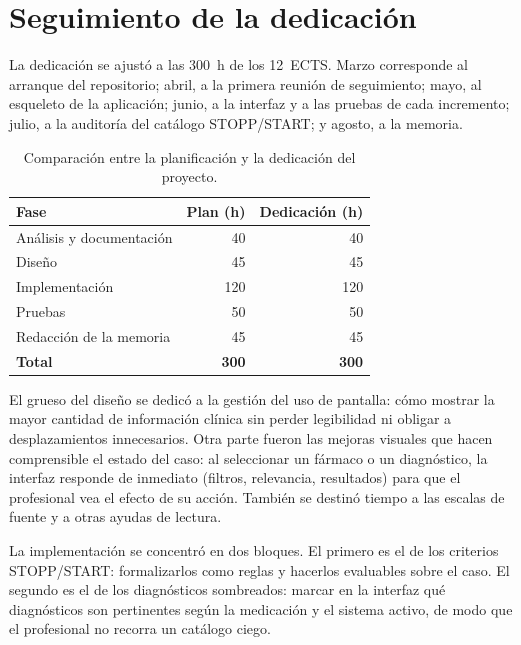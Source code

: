 

\section{Seguimiento de la dedicación}
\label{sec:seguimiento}

La dedicación se ajustó a las 300~h de los 12~ECTS. Marzo corresponde al
arranque del repositorio; abril, a la primera reunión de seguimiento; mayo,
al esqueleto de la aplicación; junio, a la interfaz y a las pruebas de cada
incremento; julio, a la auditoría del catálogo STOPP/START; y agosto, a la
memoria.

\begin{table}[H]
  \centering
  \scriptsize
  \begin{tabularx}{\textwidth}{@{}Xrr@{}}
    \toprule
    \textbf{Fase} & \textbf{Plan (h)} & \textbf{Dedicación (h)} \\
    \midrule
    Análisis y documentación & 40  & 40  \\
    Diseño                   & 45  & 45  \\
    Implementación           & 120 & 120 \\
    Pruebas                  & 50  & 50  \\
    Redacción de la memoria  & 45  & 45  \\
    \midrule
    \textbf{Total}           & \textbf{300} & \textbf{300} \\
    \bottomrule
  \end{tabularx}
  \caption{Comparación entre la planificación y la dedicación del proyecto.}
  \label{tab:seguimiento}
\end{table}

El grueso del diseño se dedicó a la gestión del uso de pantalla: cómo
mostrar la mayor cantidad de información clínica sin perder legibilidad ni
obligar a desplazamientos innecesarios. Otra parte fueron las mejoras
visuales que hacen comprensible el estado del caso: al seleccionar un
fármaco o un diagnóstico, la interfaz responde de inmediato (filtros,
relevancia, resultados) para que el profesional vea el efecto de su
acción. También se destinó tiempo a las escalas de fuente y a otras
ayudas de lectura.

La implementación se concentró en dos bloques. El primero es el de los
criterios STOPP/START: formalizarlos como reglas y hacerlos evaluables
sobre el caso. El segundo es el de los diagnósticos sombreados: marcar en
la interfaz qué diagnósticos son pertinentes según la medicación y el
sistema activo, de modo que el profesional no recorra un catálogo ciego.

